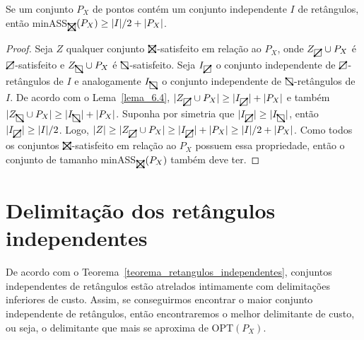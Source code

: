 \begin{theorem}\label{teorema_retangulos_independentes}
    Se um conjunto $P_X$ de pontos contém um conjunto independente $I$ de retângulos, então minASS$_{\recttotal}(P_X) \geq |I|/2 + |P_X|$.
\end{theorem}

\begin{proof}
    Seja $Z$ qualquer conjunto $\recttotal$-satisfeito em relação ao $P_X$, onde $Z_{\rectpos} \cup P_X$ é $\rectpos$-satisfeito e  $Z_{\rectneg} \cup P_X$ é $\rectneg$-satisfeito. Seja $I_{\rectpos}$ o conjunto independente de $\rectpos$-retângulos de $I$ e analogamente $I_{\rectneg}$ o conjunto independente de $\rectneg$-retângulos de $I$. De acordo com o Lema~\ref{lema_6.4}, $|Z_{\rectpos} \cup P_X| \geq |I_{\rectpos}| + |P_X|$ e também $|Z_{\rectneg} \cup P_X| \geq |I_{\rectneg}| + |P_X|$. Suponha por simetria que $|I_{\rectpos}| \geq |I_{\rectneg}|$, então $|I_{\rectpos}| \geq |I|/2$. Logo, $|Z| \geq |Z_{\rectpos} \cup P_X| \geq |I_{\rectpos}| + |P_X| \geq |I|/2 + |P_X|$. Como todos os conjuntos $\recttotal$-satisfeito em relação ao $P_X$ possuem essa propriedade, então o conjunto de tamanho minASS$_{\recttotal}(P_X)$ também deve ter.
\end{proof}

\section{Delimitação dos retângulos independentes}

De acordo com o Teorema~\ref{teorema_retangulos_independentes}, conjuntos independentes de retângulos estão atrelados intimamente com delimitações inferiores de custo. Assim, se conseguirmos encontrar o maior conjunto independente de retângulos, então encontraremos o melhor delimitante de custo, ou seja, o delimitante que mais se aproxima de OPT$(P_X)$.

